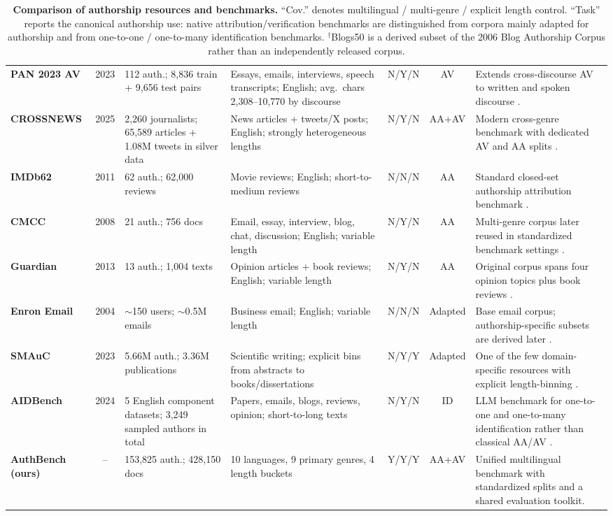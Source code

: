 \documentclass{article}
\newcommand{\rededit}[1]{{\color{editred}#1}}
\begin{document}
\begin{table}[t]
\begin{tabular}{@{}L{2.45cm}cL{2.15cm}L{4.65cm}c c L{4.35cm}@{}}
\textbf{PAN 2023 AV} & 2023 & 112 auth.; 8{,}836 train + 9{,}656 test pairs & Essays, emails, interviews, speech transcripts; English; avg.\ chars 2{,}308--10{,}770 by discourse & N/Y/N & AV & Extends cross-discourse AV to written and spoken discourse \citep{pan2023av}. \\
\textbf{CROSSNEWS} & 2025 & 2{,}260 journalists; 65{,}589 articles + 1.08M tweets in silver data & News articles + tweets/X posts; English; strongly heterogeneous lengths & N/Y/N & AA+AV & Modern cross-genre benchmark with dedicated AV and AA splits \citep{ma2025crossnews}. \\
\textbf{IMDb62} & 2011 & 62 auth.; 62{,}000 reviews & Movie reviews; English; short-to-medium reviews & N/N/N & AA & Standard closed-set authorship attribution benchmark \citep{seroussi2014authorship}. \\
\textbf{CMCC} & 2008 & 21 auth.; 756 docs & Email, essay, interview, blog, chat, discussion; English; variable length & N/Y/N & AA & Multi-genre corpus later reused in standardized benchmark settings \citep{goldstein-stewart-etal-2008-creating}. \\
\textbf{Guardian} & 2013 & 13 auth.; 1{,}004 texts & Opinion articles + book reviews; English; variable length & N/Y/N & AA & Original corpus spans four opinion topics plus book reviews \citep{stamatatos2013robustness}. \\
\textbf{Enron Email} & 2004 & $\sim$150 users; $\sim$0.5M emails & Business email; English; variable length & N/N/N & Adapted & Base email corpus; authorship-specific subsets are derived later \citep{klimt2004enron}. \\
\textbf{SMAuC} & 2023 & 5.66M auth.; 3.36M publications & Scientific writing; explicit bins from abstracts to books/dissertations & N/Y/Y & Adapted & One of the few domain-specific resources with explicit length-binning \citep{bevendorff2023smauc}. \\
\textbf{AIDBench} & 2024 & 5 English component datasets; 3{,}249 sampled authors in total & Papers, emails, blogs, reviews, opinion; short-to-long texts & N/Y/N & ID & LLM benchmark for one-to-one and one-to-many identification rather than classical AA/AV \citep{wen2024aidbench}. \\
\midrule
\textbf{AuthBench (ours)} & -- & \rededit{153{,}825 auth.; 428{,}150 docs} & \rededit{10 languages, 9 primary genres, 4 length buckets} & Y/Y/Y & AA+AV & Unified multilingual benchmark with standardized splits and a shared evaluation toolkit. \\
\bottomrule
\end{tabular}
\caption{\textbf{Comparison of authorship resources and benchmarks.} ``Cov.'' denotes multilingual / multi-genre / explicit length control. ``Task'' reports the canonical authorship use: native attribution/verification benchmarks are distinguished from corpora mainly adapted for authorship and from one-to-one / one-to-many identification benchmarks. $^\dagger$Blogs50 is a derived subset of the 2006 Blog Authorship Corpus rather than an independently released corpus.}
\label{tab:bench-comparison}
\end{table}
\end{document}
